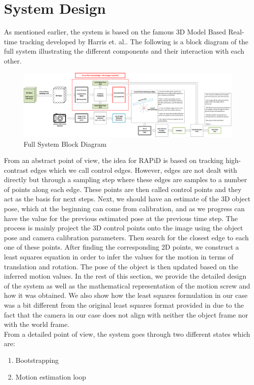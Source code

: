 \documentclass{article}
\begin{document}
\section{System Design}
As mentioned earlier, the system is based on the famous 3D Model Based Real-time tracking developed by Harris et. al.\cite{harris1990rapid}. The following is a block diagram of the full system illustrating the different components and their interaction with each other. 
\begin{figure}[H]
\centering
\includegraphics[width=\textwidth]{RAPiD_BlockDiagram.png}
\caption{Full System Block Diagram}
\end{figure}
From an abstract point of view, the idea for RAPiD\cite{harris1990rapid} is based on tracking high-contrast edges which we call control edges. However, edges are not dealt with directly but through a sampling step where these edges are samples to a number of points along each edge. These points are then called control points and they act as the basis for next steps. Next, we should have an estimate of the 3D object pose, which at the beginning can come from calibration, and as we progress can have the value for the previous estimated pose at the previous time step. The process is mainly project the 3D control points onto the image using the object pose and camera calibration parameters. Then search for the closest edge to each one of these points. After finding the corresponding 2D points, we construct a least squares equation in order to infer the values for the motion in terms of translation and rotation. The pose of the object is then updated based on the inferred motion values. In the rest of this section, we provide the detailed design of the system as well as the mathematical representation of the motion screw and how it was obtained. We also show how the least squares formulation in our case was a bit different from the original least squares format provided in \cite{harris1990rapid} due to the fact that the camera in our case does not align with neither the object frame nor with the world frame. \\
From a detailed point of view, the system goes through two different states which are:
\begin{enumerate}
\item Bootstrapping
\item Motion estimation loop
\end{enumerate}
\end{document}
